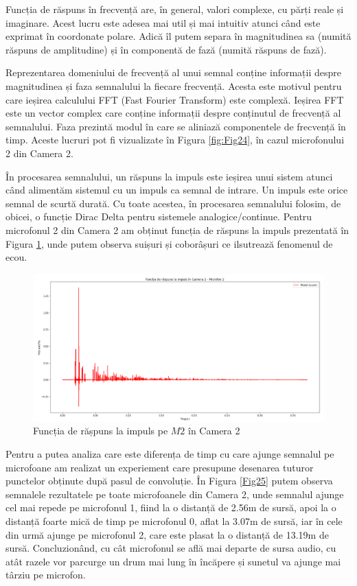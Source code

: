 	Funcția de răspuns în frecvență are, în general, valori complexe, cu părți reale și imaginare. Acest lucru este adesea mai util și mai intuitiv atunci când este exprimat în coordonate polare. Adică îl putem separa în magnitudinea sa (numită răspuns de amplitudine) și în
	componentă de fază (numită răspuns de fază).
	
	Reprezentarea domeniului de frecvență al unui semnal conține informații despre magnitudinea și faza semnalului la fiecare frecvență. Acesta este motivul pentru care ieșirea calculului FFT (Fast Fourier Transform) este complexă. Ieșirea FFT este un vector complex care conține informații despre conținutul de frecvență al semnalului. Faza prezintă modul în care se aliniază componentele de frecvență în timp. Aceste lucruri pot fi vizualizate în Figura \ref{fig:Fig24}, în cazul microfonului 2 din Camera 2.

	În procesarea semnalului, un răspuns la impuls este ieșirea unui sistem atunci când alimentăm sistemul cu un impuls ca semnal de intrare. Un impuls este orice semnal de scurtă durată. Cu toate acestea, în procesarea semnalului folosim, de obicei, o funcție Dirac Delta pentru sistemele analogice/continue. Pentru microfonul 2 din Camera 2 am obținut funcția de răspuns la impuls prezentată în Figura \ref{ir}, unde putem observa suișuri și coborâșuri ce ilsutrează fenomenul de ecou. 
	
	\begin{figure}[!htb]
		\centering
		\includegraphics[width=1\linewidth]{imagini/ir.png}
		\caption{Funcția de rășpuns la impuls pe $M2$ în Camera 2}
		\label{ir}
	\end{figure}
	
	Pentru a putea analiza care este diferența de timp cu care ajunge semnalul pe microfoane am realizat un experiement care presupune desenarea tuturor punctelor obținute după pasul de convoluție. În Figura \ref{Fig25} putem observa semnalele rezultatele pe toate microfoanele din Camera 2, unde semnalul ajunge cel mai repede pe microfonul 1, fiind la o distanță de 2.56m de sursă, apoi la o distanță foarte mică de timp pe microfonul 0, aflat la 3.07m de sursă, iar în cele din urmă ajunge pe microfonul 2, care este plasat la o distanță de 13.19m de sursă. Concluzionând, cu cât microfonul se află mai departe de sursa audio, cu atât razele vor parcurge un drum mai lung în încăpere și sunetul va ajunge mai târziu pe microfon.
		
